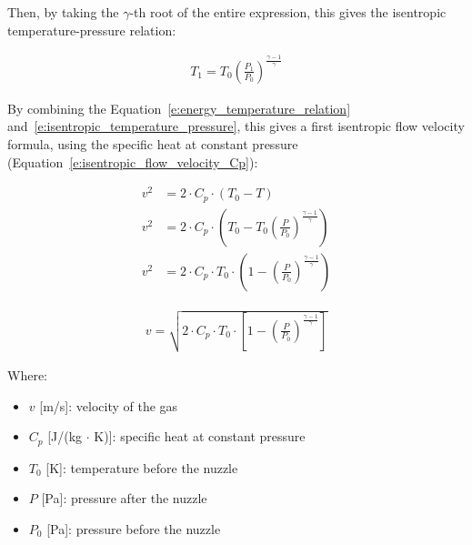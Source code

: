 \documentclass[../main]{subfiles}
\begin{document}
Then, by taking the $\gamma$-th root of the entire expression, this gives the isentropic temperature-pressure relation:

\vspace{0mm}
\begin{equation}
\begin{aligned}
T_1 = T_0 \left(\frac{P_1}{P_0}\right)^{\frac{\gamma-1}{\gamma}}
\label{e:isentropic_temperature_pressure}
\end{aligned}
\end{equation}
\vspace{0mm}

By combining the Equation~\ref{e:energy_temperature_relation} and~\ref{e:isentropic_temperature_pressure}, this gives a first isentropic flow velocity formula, using the specific heat at constant pressure (Equation~\ref{e:isentropic_flow_velocity_Cp}):

\vspace{0mm}
\begin{align*}
v^2 &= 2 \cdot C_p \cdot (T_0 - T) \\
v^2 &= 2 \cdot C_p \cdot \left(T_0 - T_0 \left(\frac{P}{P_0}\right)^{\frac{\gamma-1}{\gamma}}\right) \\
v^2 &= 2 \cdot C_p \cdot T_0 \cdot \left(1 - \left(\frac{P}{P_0}\right)^{\frac{\gamma-1}{\gamma}}\right)
\end{align*}
\vspace{0mm}

\vspace{0mm}
\begin{equation}
\begin{aligned}
v = \sqrt{2 \cdot C_p \cdot T_0 \cdot \left[1 - \left(\frac{P}{P_0}\right)^{\frac{\gamma-1}{\gamma}}\right]}
\label{e:isentropic_flow_velocity_Cp}
\end{aligned}
\end{equation}
\vspace{0mm}

\vspace{0mm}
\begin{minipage}{\linewidth}
Where:
\begin{itemize}
    \item[] $v$ [m/s]: velocity of the gas
    \item[] $C_{p}$ [J/(kg $\cdot$ K)]: specific heat at constant pressure
    \item[] $T_{0}$ [K]: temperature before the nuzzle
    \item[] $P$ [Pa]: pressure after the nuzzle
    \item[] $P_{0}$ [Pa]: pressure before the nuzzle

\end{itemize}
\end{minipage}
\vspace{0mm}
\end{document}
